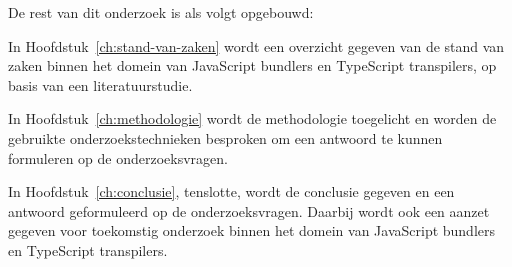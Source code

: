 
De rest van dit onderzoek is als volgt opgebouwd:

In Hoofdstuk~\ref{ch:stand-van-zaken} wordt een overzicht gegeven van de stand van zaken binnen het domein van JavaScript bundlers en TypeScript transpilers, op basis van een literatuurstudie.

In Hoofdstuk~\ref{ch:methodologie} wordt de methodologie toegelicht en worden de gebruikte onderzoekstechnieken besproken om een antwoord te kunnen formuleren op de onderzoeksvragen.


In Hoofdstuk~\ref{ch:conclusie}, tenslotte, wordt de conclusie gegeven en een antwoord geformuleerd op de onderzoeksvragen. Daarbij wordt ook een aanzet gegeven voor toekomstig onderzoek binnen het domein van JavaScript bundlers en TypeScript transpilers.
